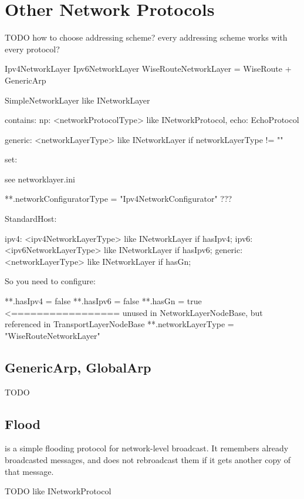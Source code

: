 \chapter{Other Network Protocols}
\label{cha:other-network-protocols}

TODO how to choose addressing scheme?  every addressing scheme works with every protocol?  

Ipv4NetworkLayer
Ipv6NetworkLayer
WiseRouteNetworkLayer = WiseRoute + GenericArp

SimpleNetworkLayer like INetworkLayer

contains:
  np: <networkProtocolType> like INetworkProtocol,
  echo: EchoProtocol

generic: <networkLayerType> like INetworkLayer if networkLayerType != ""

set:


see networklayer.ini

**.networkConfiguratorType = "Ipv4NetworkConfigurator"   ???


StandardHost:

\begin{ned}
ipv4: <ipv4NetworkLayerType> like INetworkLayer if hasIpv4;
ipv6: <ipv6NetworkLayerType> like INetworkLayer if hasIpv6;
generic: <networkLayerType> like INetworkLayer if hasGn;
\end{ned}

So you need to configure:

\begin{inifile}
**.hasIpv4 = false
**.hasIpv6 = false
**.hasGn = true  <================= unused in NetworkLayerNodeBase, but referenced in TransportLayerNodeBase
**.networkLayerType = "WiseRouteNetworkLayer"
\end{inifile}


\section{GenericArp, GlobalArp}

TODO

\section{Flood}

 is a simple flooding protocol for network-level broadcast.
It remembers already broadcasted messages, and does not rebroadcast 
them if it gets another copy of that message.

TODO like INetworkProtocol

